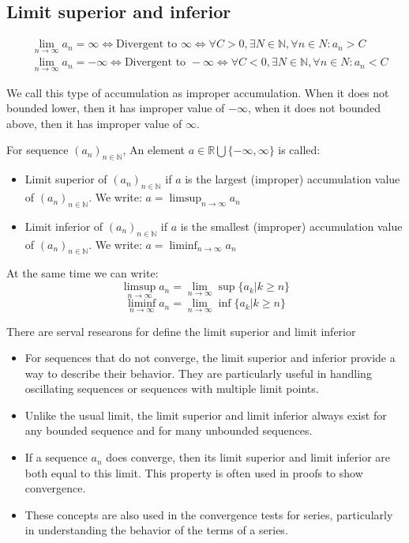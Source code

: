 \documentclass{article}
\newcommand{\R}{\mathbb{R}}
\begin{document}
\subsection{Limit superior and inferior}
\begin{equation*}
	\begin{aligned}
		&\lim_{n\to \infty}a_n=\infty \Leftrightarrow \text{Divergent to }\infty \Leftrightarrow  \forall C>0, \exists N\in \mathbb{N}, \forall n\in N: a_n>C\\
		&\lim_{n\to \infty}a_n=-\infty \Leftrightarrow \text{Divergent to }-\infty \Leftrightarrow  \forall C<0, \exists N\in \mathbb{N}, \forall n\in N: a_n<C
	\end{aligned}
\end{equation*}

We call this type of accumulation as improper accumulation. When it does not bounded lower, then it has improper value of $-\infty$, when it does not bounded above, then it has improper value of $\infty$.

\begin{definition}
	For sequence $(a_n)_{n\in \mathbb{N}} $, An element $a\in \R \bigcup \{-\infty,\infty \}$ is called:
	\begin{itemize}
		\item Limit superior of $(a_n)_{n\in \mathbb{N}} $ if $a$ is the largest (improper) accumulation value of $(a_n)_{n\in \mathbb{N}} $. We write: $a=\limsup_{n\to \infty}a_n$
		\item Limit inferior of $(a_n)_{n\in \mathbb{N}} $ if $a$ is the smallest (improper) accumulation value of $(a_n)_{n\in \mathbb{N}} $. We write: $a=\liminf_{n\to \infty}a_n$
	\end{itemize}
	At the same time we can write:
	\begin{equation*}
		\limsup_{n\to \infty}a_n=\lim_{n\to \infty}\sup\{a_k | k\geq n \}
	\end{equation*}
		\begin{equation*}
		\liminf_{n\to \infty}a_n=\lim_{n\to \infty}\inf\{a_k | k\geq n \}
	\end{equation*}
\end{definition}

There are serval researons for define the limit superior and limit inferior
\begin{itemize}
	\item For sequences that do not converge, the limit superior and inferior provide a way to describe their behavior. They are particularly useful in handling oscillating sequences or sequences with multiple limit points. 
	\item Unlike the usual limit, the limit superior and limit inferior always exist for any bounded sequence and for many unbounded sequences.
	\item If a sequence $a_n$ does converge, then its limit superior and limit inferior are both equal to this limit. This property is often used in proofs to show convergence.
	\item These concepts are also used in the convergence tests for series, particularly in understanding the behavior of the terms of a series.
\end{itemize}
\end{document}
